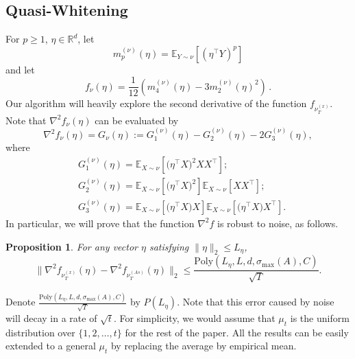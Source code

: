 \documentclass[twoside]{article}
\newcommand{\E}{\mathbb{E}}
\newcommand{\real}{\mathbb{R}}
\newtheorem{prop}[lemma]{Proposition}
\theoremstyle{definition}
\begin{document}
\subsection{Quasi-Whitening}
For $p\ge 1$, $\eta\in \real^d$, 
let 
\begin{equation}
\label{eq:momnent}
m_p^{(\nu)}(\eta) = \E_{Y\sim \nu}[ (\eta^\top Y)^p ]
\end{equation}
and let
\begin{equation}
\label{eq:funcf}
f_{\nu}(\eta) = \frac1{12} \left( m_4^{(\nu)}(\eta) - 3 m_2^{(\nu)}(\eta)^2 \right)\,.
\end{equation}
Our algorithm will heavily explore the second derivative of the function $f_{\nu_T^{(x)}}$. 
Note that $\nabla^2f_{\nu}(\eta)$  can be evaluated by
\begin{equation}
\label{eq:G}
\nabla^2 f_{\nu}(\eta) = G_{\nu}(\eta):= G_1^{(\nu)}(\eta) - G_2^{(\nu)}(\eta) -2G_3^{(\nu)}(\eta),
\end{equation}
where 
\vspace{-3mm}
\begin{align*}
& G_1^{(\nu)}(\eta) =  \E_{X\sim \nu} [\big(\eta^{\top}X\big)^2XX^{\top}]; \\
& G_2^{(\nu)}(\eta) = \E_{X\sim \nu} [\big(\eta^{\top}X\big)^2] \E_{X\sim \nu} [XX^{\top}]; \\
& G_3^{(\nu)}(\eta) = \E_{X\sim \nu} [\big(\eta^{\top}X\big)X] \E_{X\sim \nu} [\big(\eta^{\top}X\big)X^{\top}].
\end{align*} 
In particular, we will prove that the function $\nabla^2f$ is robust to noise, as follows. 
\begin{prop}
\label{prop:denoise}
For any vector $\eta$ satisfying $\|\eta\|_2\le L_{\eta}$,
\[
\| \nabla^2f_{\nu_T^{(x)}}(\eta) - \nabla^2f_{\nu_T^{(As)}}(\eta) \|_2 \le \frac{\text{Poly}(L_{\eta}, L, d, \sigma_{\max}(A), C)}{\sqrt{T}}. 
\] 
\end{prop}  
Denote $\frac{\text{Poly}(L_{\eta}, L, d, \sigma_{\max}(A), C)}{\sqrt{T}}$ by $P(L_{\eta})$. Note that this error caused by noise will decay in a rate of $\sqrt{t}$.
For simplicity, we would assume that $\mu_t$ is the uniform distribution over $\{1,2,\ldots, t\}$ for the rest of the paper.
All the results can be easily extended to a general $\mu_t$ by replacing the average by empirical mean. 
\end{document}
